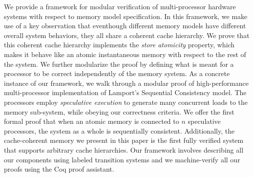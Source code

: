 We provide a framework for modular verification of multi-processor hardware
systems with respect to memory model specification. In this framework, we make
use of a key observation that eventhough different memory models have different
overall system behaviors, they all share a coherent cache hierarchy. We prove
that this coherent cache hierarchy implements the \emph{store atomicity}
property, which makes it behave like an atomic instantaneous memory with
respect to the rest of the system. We further modularize the proof by defining
what is meant for a processor to be correct independently of the memory system.
As a concrete instance of our framework, we walk through a modular proof of
high-performance multi-processor implementation of Lamport's Sequential
Consistency model. The processors employ \emph{speculative execution} to
generate many concurrent loads to the memory sub-system, while obeying our
correctness criteria. We offer the first formal proof that when an atomic
memory is connected to $n$ speculative processors, the system as a whole is
sequentially consistent.  Additionally, the cache-coherent memory we present in
this paper is the first fully verified system that supports arbitrary cache
hierarchies. Our framework involves describing all our components using labeled
transition systems and we machine-verify all our proofs using the Coq proof
assistant.

